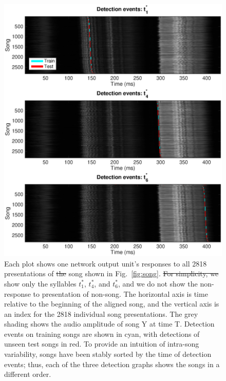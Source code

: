 \documentclass[10pt,letterpaper]{article}
\newcommand\fig[1]{Fig.~\ref{#1}}
\providecommand{\DIFaddtex}[1]{{\protect\color{blue}\uwave{#1}}} %
\providecommand{\DIFdeltex}[1]{{\protect\color{red}\sout{#1}}}                      %
\providecommand{\DIFaddFL}[1]{\DIFadd{#1}} %
\providecommand{\DIFdelFL}[1]{\DIFdel{#1}} %
\providecommand{\DIFaddbeginFL}{} %
\providecommand{\DIFaddendFL}{} %
\providecommand{\DIFdelbeginFL}{} %
\providecommand{\DIFdelendFL}{} %
\providecommand{\DIFadd}[1]{\texorpdfstring{\DIFaddtex{#1}}{#1}} %
\providecommand{\DIFdel}[1]{\texorpdfstring{\DIFdeltex{#1}}{}} %
\newcommand{\DIFscaledelfig}{0.5}
\newlength{\DIFdelgraphicswidth} %
\newlength{\DIFdelgraphicsheight} %
\newcommand{\DIFaddincludegraphics}[2][]{{\color{blue}\fbox{\DIFOincludegraphics[#1]{#2}}}} %
\newcommand{\DIFdelincludegraphics}[2][]{%
\sbox{\DIFdelgraphicsbox}{\DIFOincludegraphics[#1]{#2}}%
\settoboxwidth{\DIFdelgraphicswidth}{\DIFdelgraphicsbox} %
\settoboxtotalheight{\DIFdelgraphicsheight}{\DIFdelgraphicsbox} %
\scalebox{\DIFscaledelfig}{%
\parbox[b]{\DIFdelgraphicswidth}{\usebox{\DIFdelgraphicsbox}\\[-\baselineskip] \rule{\DIFdelgraphicswidth}{0em}}\llap{\resizebox{\DIFdelgraphicswidth}{\DIFdelgraphicsheight}{%
\setlength{\unitlength}{\DIFdelgraphicswidth}%
\begin{picture}(1,1)%
\thicklines\linethickness{2pt} %
{\color[rgb]{1,0,0}\put(0,0){\framebox(1,1){}}}%
{\color[rgb]{1,0,0}\put(0,0){\line( 1,1){1}}}%
{\color[rgb]{1,0,0}\put(0,1){\line(1,-1){1}}}%
\end{picture}%
}\hspace*{3pt}}} %
} %
\DeclareRobustCommand{\DIFaddbeginFL}{\DIFOaddbeginFL \let\includegraphics\DIFaddincludegraphics} %
\DeclareRobustCommand{\DIFaddendFL}{\DIFOaddendFL \let\includegraphics\DIFOincludegraphics} %
\DeclareRobustCommand{\DIFdelbeginFL}{\DIFOdelbeginFL \let\includegraphics\DIFdelincludegraphics} %
\DeclareRobustCommand{\DIFdelendFL}{\DIFOaddendFL \let\includegraphics\DIFOincludegraphics} %
\begin{document}
\begin{figure}
  \includegraphics[width=\textwidth]{Fig2}
  \caption{Each plot shows one network output unit's responses to all
    2818 presentations of \DIFdelbeginFL \DIFdelFL{the }\DIFdelendFL \DIFaddbeginFL \DIFaddFL{lny64's }\DIFaddendFL song shown in \fig{fig:song}.  \DIFdelbeginFL \DIFdelFL{For
    simplicity, we }\DIFdelendFL \DIFaddbeginFL \DIFaddFL{We
    }\DIFaddendFL show only the syllables $t^*_1$, $t^*_4$, and $t^*_6$, and we do
    not show the non-response to presentation of non-song. The
    horizontal axis is time relative to the beginning of the aligned
    song, and the vertical axis is an index for the 2818 individual
    song presentations. The grey shading shows the audio amplitude of
    song Y at time T. Detection events on training songs are shown in
    cyan, with detections of unseen test songs in red.  To provide an
    intuition of intra-song variability, songs have been stably sorted
    by the time of detection events; thus, each of the three detection
    graphs shows the songs in a different order.}
  \label{fig:detection_raster}
\end{figure}
\end{document}
